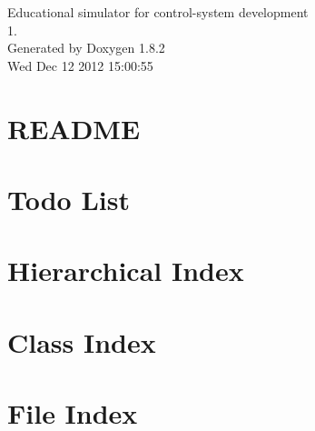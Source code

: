 \documentclass{book}
\begin{document}
\hypersetup{pageanchor=false,citecolor=blue}
\begin{titlepage}
\vspace*{7cm}
\begin{center}
{\Large Educational simulator for control-\/system development \\[1ex]\large 1. }\\
\vspace*{1cm}
{\large Generated by Doxygen 1.8.2}\\
\vspace*{0.5cm}
{\small Wed Dec 12 2012 15:00:55}\\
\end{center}
\end{titlepage}
\clearemptydoublepage
{}
\tableofcontents
\clearemptydoublepage
{}
\hypersetup{pageanchor=true,citecolor=blue}
\chapter{R\-E\-A\-D\-M\-E}
\label{index}\hypertarget{index}{}
\chapter{Todo List}
\label{todo}
\hypertarget{todo}{}

\chapter{Hierarchical Index}

\chapter{Class Index}

\chapter{File Index}

\end{document}
